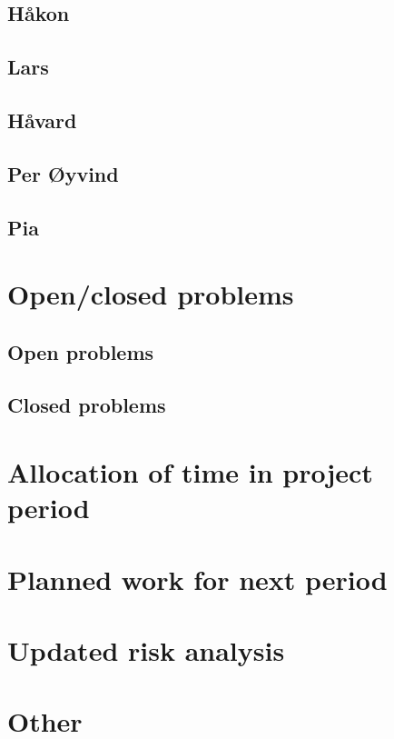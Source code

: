 \documentclass[12pt]{article}
\begin{document}
\subsection*{Håkon}
\subsection*{Lars}
\subsection*{Håvard}
\subsection*{Per Øyvind}
\subsection*{Pia}
\section{Open/closed problems}
\subsection{Open problems}
\subsection{Closed problems}
\section{Allocation of time in project period}
\section{Planned work for next period}
\section{Updated risk analysis}
\section{Other}
\end{document}

